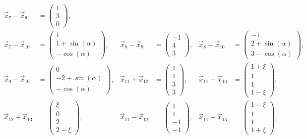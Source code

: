\documentclass[11pt]{exam}
\begin{document}
\begin{questions}
\begin{solution}
\begin{align*}
		\vec{x}_7-\vec{x}_9&=\left(\begin{array}{c}1\\3\\0\end{array}\right),\\
		\vec{x}_7-\vec{x}_{10}&=\left(\begin{array}{c}1\\1+\sin(\alpha)\\-\cos(\alpha)\end{array}\right),&
		\vec{x}_8-\vec{x}_9&=\left(\begin{array}{c}-1\\4\\3\end{array}\right),&
		\vec{x}_8-\vec{x}_{10}&=\left(\begin{array}{c}-1\\2+\sin(\alpha)\\3-\cos(\alpha)\end{array}\right),\\
		\vec{x}_9-\vec{x}_{10}&=\left(\begin{array}{c}0\\-2+\sin(\alpha)\\-\cos(\alpha)\end{array}\right),&
		\vec{x}_{11}+\vec{x}_{12}&=\left(\begin{array}{c}1\\1\\3\\3\end{array}\right),&
		\vec{x}_{11}+\vec{x}_{13}&=\left(\begin{array}{c}1+\xi\\1\\1\\1-\xi\end{array}\right),\\
		\vec{x}_{12}+\vec{x}_{13}&=\left(\begin{array}{c}\xi\\0\\2\\2-\xi\end{array}\right),&
		\vec{x}_{11}-\vec{x}_{12}&=\left(\begin{array}{c}1\\1\\-1\\-1\end{array}\right),&
		\vec{x}_{11}-\vec{x}_{13}&=\left(\begin{array}{c}1-\xi\\1\\1\\1+\xi\end{array}\right),\\

\end{align*}
\end{solution}
\end{questions}
\end{document}
